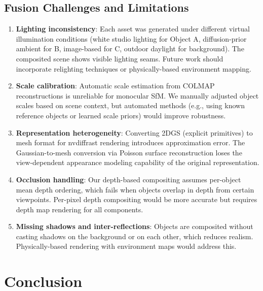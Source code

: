 \documentclass{article}
\begin{document}
\subsection{Fusion Challenges and Limitations}

\begin{enumerate}[leftmargin=*]
    \item \textbf{Lighting inconsistency}: Each asset was generated under different
    virtual illumination conditions (white studio lighting for Object A,
    diffusion-prior ambient for B, image-based for C, outdoor daylight for
    background). The composited scene shows visible lighting seams. Future work
    should incorporate relighting techniques or physically-based environment
    mapping.

    \item \textbf{Scale calibration}: Automatic scale estimation from COLMAP
    reconstructions is unreliable for monocular SfM. We manually adjusted object
    scales based on scene context, but automated methods (e.g., using known
    reference objects or learned scale priors) would improve robustness.

    \item \textbf{Representation heterogeneity}: Converting 2DGS (explicit
    primitives) to mesh format for nvdiffrast rendering introduces approximation
    error. The Gaussian-to-mesh conversion via Poisson surface reconstruction
    loses the view-dependent appearance modeling capability of the original
    representation.

    \item \textbf{Occlusion handling}: Our depth-based compositing assumes
    per-object mean depth ordering, which fails when objects overlap in depth
    from certain viewpoints. Per-pixel depth compositing would be more accurate
    but requires depth map rendering for all components.

    \item \textbf{Missing shadows and inter-reflections}: Objects are composited
    without casting shadows on the background or on each other, which reduces
    realism. Physically-based rendering with environment maps would address this.
\end{enumerate}

\section{Conclusion}
\end{document}

